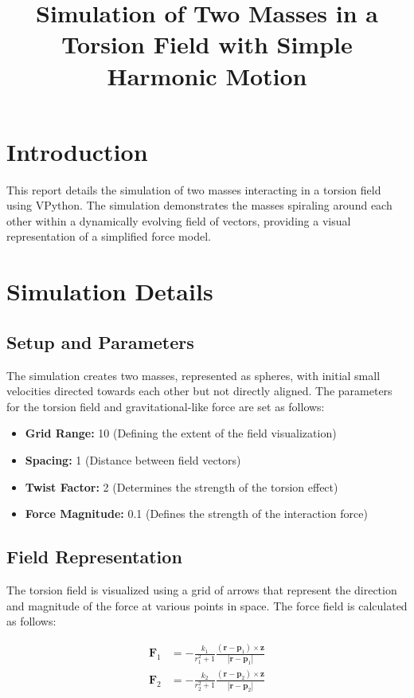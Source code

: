 \documentclass{article}
\title{Simulation of Two Masses in a Torsion Field with Simple Harmonic Motion}
\author{}
\date{}
\begin{document}
\maketitle

\section{Introduction}
This report details the simulation of two masses interacting in a torsion field using VPython. The simulation demonstrates the masses spiraling around each other within a dynamically evolving field of vectors, providing a visual representation of a simplified force model. 

\section{Simulation Details}

\subsection{Setup and Parameters}
The simulation creates two masses, represented as spheres, with initial small velocities directed towards each other but not directly aligned. The parameters for the torsion field and gravitational-like force are set as follows:
\begin{itemize}
    \item \textbf{Grid Range:} 10 (Defining the extent of the field visualization)
    \item \textbf{Spacing:} 1 (Distance between field vectors)
    \item \textbf{Twist Factor:} 2 (Determines the strength of the torsion effect)
    \item \textbf{Force Magnitude:} 0.1 (Defines the strength of the interaction force)
\end{itemize}

\subsection{Field Representation}
The torsion field is visualized using a grid of arrows that represent the direction and magnitude of the force at various points in space. The force field is calculated as follows:

\begin{align}
\mathbf{F}_1 &= -\frac{k_1}{r_1^2 + 1} \frac{(\mathbf{r} - \mathbf{p}_1) \times \mathbf{z}}{|\mathbf{r} - \mathbf{p}_1|} \\
\mathbf{F}_2 &= -\frac{k_2}{r_2^2 + 1} \frac{(\mathbf{r} - \mathbf{p}_2) \times \mathbf{z}}{|\mathbf{r} - \mathbf{p}_2|}
\end{align}
\end{document}
